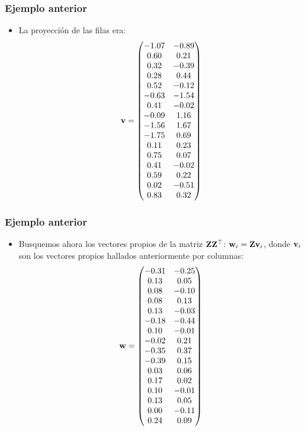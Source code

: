 \begin{frame}
\frametitle{Ejemplo anterior}
\begin{itemize}
\item<2->{La proyección de las filas era:{\tiny $$
\mathbf{v}=\begin{pmatrix}
-1.07 & -0.89 \\
0.60 & 0.21 \\
0.32 & -0.39 \\
0.28 & 0.44 \\
0.52 & -0.12 \\
-0.63 & -1.54 \\
0.41 & -0.02 \\
-0.09 & 1.16 \\
-1.56 & 1.67 \\
-1.75 & 0.69 \\
0.11 & 0.23 \\
0.75 & 0.07 \\
0.41 & -0.02 \\
0.59 & 0.22 \\
0.02 & -0.51 \\
0.83 & 0.32 
\end{pmatrix}
$$}
}
\end{itemize}
\end{frame}
\begin{frame}
\frametitle{Ejemplo anterior}
\begin{itemize}
\item<2->{Busquemos ahora los vectores propios de la matriz $\mathbf{Z}\mathbf{Z}^\top$: $\mathbf{w}_i = \mathbf{Z}\mathbf{v}_i$, donde $\mathbf{v}_i$ son los vectores propios hallados anteriormente por columnas:
{\tiny $$
\mathbf{w}=\begin{pmatrix}
-0.31 & -0.25 \\
0.13 & 0.05 \\
0.08 & -0.10 \\
0.08 & 0.13 \\
0.13 & -0.03 \\
-0.18 & -0.44 \\
0.10 & -0.01 \\
-0.02 & 0.21 \\
-0.35 & 0.37 \\
-0.39 & 0.15 \\
0.03 & 0.06 \\
0.17 & 0.02 \\
0.10 & -0.01 \\
0.13 & 0.05 \\
0.00 & -0.11 \\
0.24 & 0.09 \\
\end{pmatrix}
$$}}
\end{itemize}
\end{frame}

